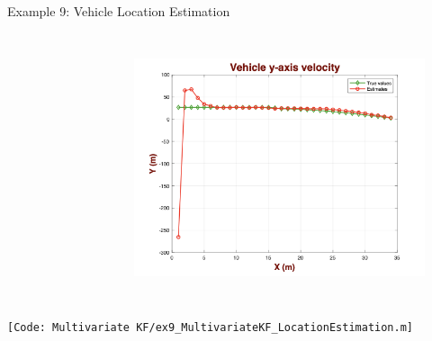 \begin{frame}{Example 9: Vehicle Location Estimation}
\begin{columns}
\begin{figure}
    \label{fig:enter-label}
\end{figure}
\vspace{-15pt}
\begin{figure}
    \centering
    \includegraphics[width=0.9\linewidth]{Figures//Chapter3/Ex9_y_velcity.png}
    \label{fig:enter-label}
\end{figure}
\end{columns}
\texttt{\tiny [Code: Multivariate KF/ex9\_MultivariateKF\_LocationEstimation.m]}
\end{frame}
